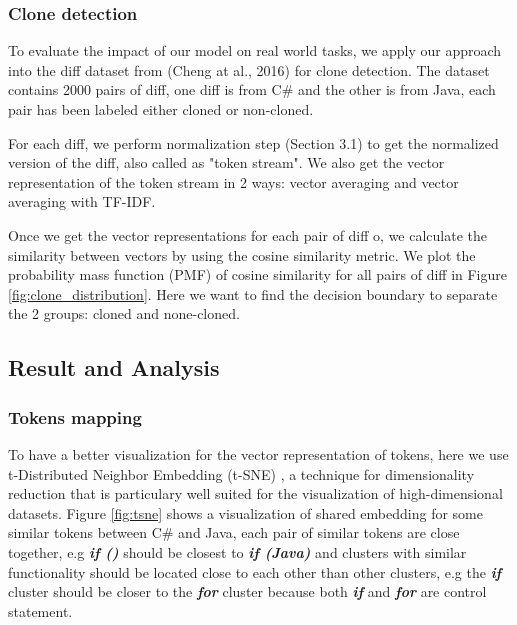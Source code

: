 \subsubsection{Clone detection}
To evaluate the impact of our model on real world tasks, we apply our approach into the diff dataset from (Cheng at al., 2016)\cite{cheng2017clcminer} for clone detection. The dataset contains 2000 pairs of diff, one diff is from C\# and the other is from Java, each pair has been labeled either cloned or non-cloned. 

For each diff, we perform normalization step (Section 3.1) to get the normalized version of the diff, also called as "token stream". We also get the vector representation of the token stream in 2 ways: vector averaging and vector averaging with TF-IDF.

Once we get the vector representations for each pair of diff o, we calculate the similarity between vectors by using the cosine similarity metric. We plot the probability mass function (PMF) of cosine similarity for all pairs of diff in Figure \ref{fig:clone_distribution}. Here we want to find the decision boundary to separate the 2 groups: cloned and none-cloned. 





\subsection{Result and Analysis}
\subsubsection{Tokens mapping}
To have a better visualization for the vector representation of tokens, here we use t-Distributed Neighbor Embedding (t-SNE) \cite{maaten2008visualizing}, a technique for dimensionality reduction that is particulary well suited for the visualization of high-dimensional datasets. Figure \ref{fig:tsne} shows a visualization of shared embedding for some similar tokens between C\# and Java, each pair of similar tokens are close together, e.g \textit{\textbf{if ()}} should be closest to \textit{\textbf{if (Java)}} and clusters with similar functionality should be located close to each other than other clusters, e.g the \textit{\textbf{if}} cluster should be closer to the \textit{\textbf{for}} cluster because both \textit{\textbf{if}} and \textit{\textbf{for}} are control statement.



